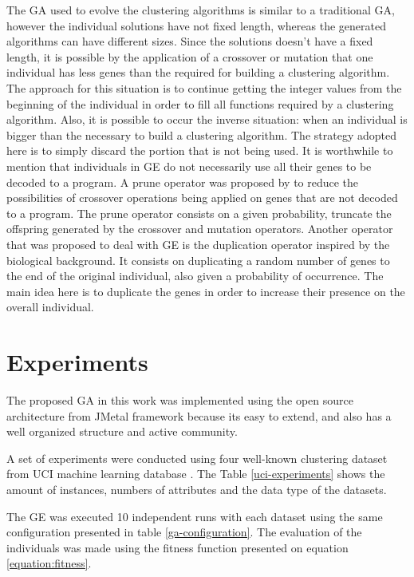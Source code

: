 \documentclass[journal]{IEEEtran}
\begin{document}
	The GA used to evolve the clustering algorithms is similar to a traditional GA, however the individual solutions have not fixed length, whereas the generated algorithms can have different sizes. Since the solutions doesn't have a fixed length, it is possible by the application of a crossover or mutation that one individual has less genes than the required for building a clustering algorithm. The approach for this situation is to continue getting the integer values from the beginning of the individual in order to fill all functions required by a clustering algorithm. Also, it is possible to occur the inverse situation: when an individual is bigger than the necessary to build a clustering algorithm. The strategy adopted here is to simply discard the portion that is not being used. It is worthwhile to mention that individuals in GE do not necessarily use all their genes to be decoded to a program. A prune operator was proposed by \cite{ryan1998grammatical} to reduce the possibilities of crossover operations being applied on genes that are not decoded to a program. The prune operator consists on a given probability, truncate the offspring generated by the crossover and mutation operators. Another operator that was proposed to deal with GE is the duplication operator inspired by the biological background. It consists on duplicating a random number of genes to the end of the original individual, also given a probability of occurrence. The main idea here is to duplicate the genes in order to increase their presence on the overall individual.
	
	
	\section{Experiments} \label{sec:experiments}
	
	The proposed GA in this work was implemented using the open source architecture from JMetal framework \cite{jMetal} because its easy to extend, and also has a well organized structure and active community.  
	
	A set of experiments were conducted using  four well-known clustering dataset from UCI machine learning database \cite{uci}. The Table \ref{uci-experiments} shows the amount of instances, numbers of attributes and the data type of the datasets. 
	
	The GE was executed 10 independent runs with each dataset using the same configuration presented in table \ref{ga-configuration}. The evaluation of the individuals was made using the fitness function presented on equation \ref{equation:fitness}.
	
\end{document}
